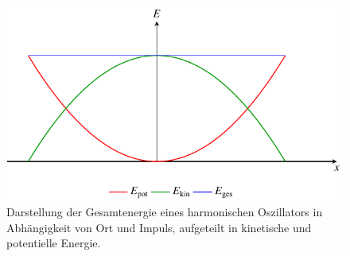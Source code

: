 %
%
%
\begin{figure}
\centering
\includegraphics{papers/fourier/images/hmo_energiediagramm.pdf}
\caption{Darstellung der Gesamtenergie eines harmonischen Oszillators in Abhängigkeit von Ort und Impuls, aufgeteilt in kinetische und potentielle Energie.%
\label{fourier:fig:hmo_energiediagramm}}
\end{figure}